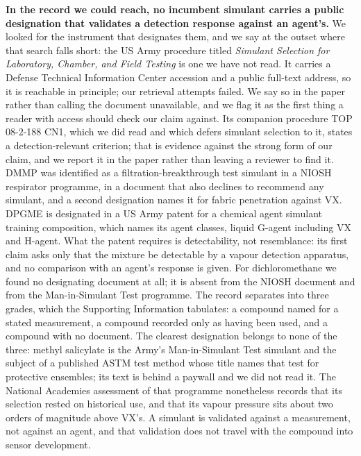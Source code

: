 \documentclass[11pt,a4paper]{article}
\begin{document}
\textbf{In the record we could reach, no incumbent simulant carries a public
designation that validates a detection response against an agent's.} We looked for the instrument that
designates them, and we say at the outset where that search falls short: the US
Army procedure titled \emph{Simulant Selection for Laboratory, Chamber, and
Field Testing} is one we have not read. It carries a Defense Technical
Information Center accession and a public full-text address, so it is reachable
in principle; our retrieval attempts failed. We say so in the paper rather than
calling the document unavailable, and we flag it as the first thing a reader
with access should check our claim against. Its companion
procedure TOP 08-2-188 CN1, which we did read and which defers simulant
selection to it, states a detection-relevant criterion; that is evidence
against the strong form of our claim, and we report it in the paper rather
than leaving a reviewer to find it. DMMP was identified as a filtration-breakthrough test simulant in a NIOSH
respirator programme, in a document that also declines to recommend any
simulant, and a second designation names it for fabric penetration against VX.
DPGME is designated in a US Army patent for a chemical agent simulant training
composition, which names its agent classes, liquid G-agent including VX and
H-agent. What the patent requires is detectability, not resemblance: its first
claim asks only that the mixture be detectable by a vapour detection apparatus,
and no comparison with an agent's response is given. For dichloromethane we found no designating document
at all; it is absent from the NIOSH document and from the Man-in-Simulant
Test programme. The record separates into three grades, which the Supporting
Information tabulates: a compound named for a stated measurement, a compound recorded only
as having been used, and a compound with no document. The clearest designation
belongs to none of the three: methyl salicylate is the Army's Man-in-Simulant
Test simulant and the subject of a published ASTM test method whose title names
that test for protective ensembles; its text is behind a paywall and we did not
read it. The National
Academies assessment of that programme nonetheless records that its selection
rested on historical use, and that its vapour pressure sits about two orders of
magnitude above VX's. A simulant is validated against a
measurement, not against an agent, and that validation does not travel with the
compound into sensor development.
\end{document}
